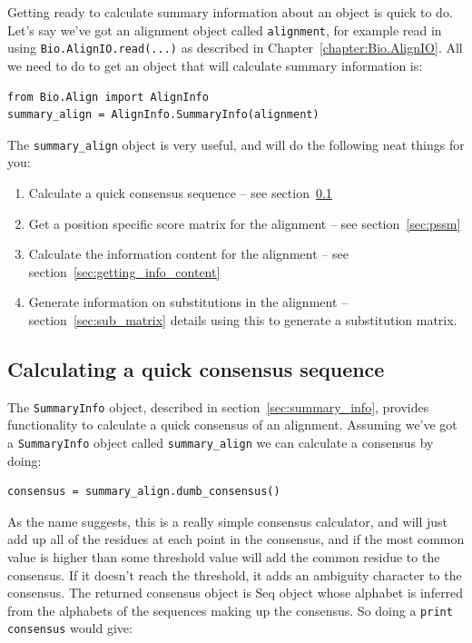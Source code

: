 \documentclass{report}
\begin{document}
Getting ready to calculate summary information about an object is quick to do. Let's say we've got an alignment object called \verb|alignment|, for example read in using \verb|Bio.AlignIO.read(...)| as described in Chapter~\ref{chapter:Bio.AlignIO}. All we need to do to get an object that will calculate summary information is:

\begin{verbatim}
from Bio.Align import AlignInfo
summary_align = AlignInfo.SummaryInfo(alignment)
\end{verbatim}

The \verb|summary_align| object is very useful, and will do the following neat things for you:

\begin{enumerate}
  \item Calculate a quick consensus sequence -- see section~\ref{sec:consensus}
  \item Get a position specific score matrix for the alignment -- see section~\ref{sec:pssm}
  \item Calculate the information content for the alignment -- see section~\ref{sec:getting_info_content}
  \item Generate information on substitutions in the alignment -- section~\ref{sec:sub_matrix} details using this to generate a substitution matrix.
\end{enumerate}

\subsection{Calculating a quick consensus sequence}
\label{sec:consensus}

The \verb|SummaryInfo| object, described in section~\ref{sec:summary_info}, provides functionality to calculate a quick consensus of an alignment. Assuming we've got a \verb|SummaryInfo| object called \verb|summary_align| we can calculate a consensus by doing:

\begin{verbatim}
consensus = summary_align.dumb_consensus()
\end{verbatim}

As the name suggests, this is a really simple consensus calculator, and will just add up all of the residues at each point in the consensus, and if the most common value is higher than some threshold value will add the common residue to the consensus. If it doesn't reach the threshold, it adds an ambiguity character to the consensus. The returned consensus object is Seq object whose alphabet is inferred from the alphabets of the sequences making up the consensus. So doing a \verb|print consensus| would give:
\end{document}
